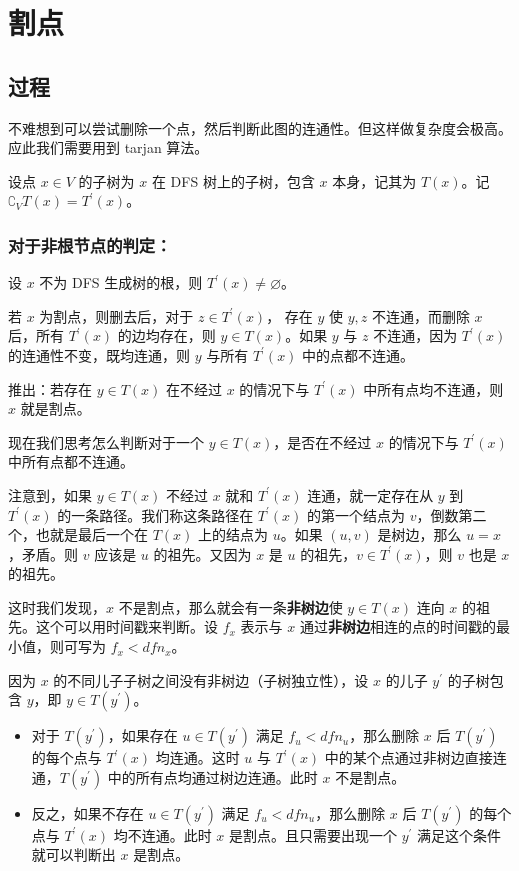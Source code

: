 \documentclass[11pt,oneside,a4paper,UTF8]{book}
\begin{document}
	
	\section{割点}
	\subsection{过程}
	不难想到可以尝试删除一个点，然后判断此图的连通性。但这样做复杂度会极高。应此我们需要用到 tarjan 算法。\par
	设点 $x\in V$ 的子树为 $x$ 在 DFS 树上的子树，包含 $x$ 本身，记其为 $T(x)$。记 $\complement_{V}T(x) = T^{\prime}(x)$。
	\subsubsection{对于非根节点的判定：}
	设 $x$ 不为 DFS 生成树的根，则 $T^{\prime}(x) \not= \varnothing$。\par
	若 $x$ 为割点，则删去后，对于 $z \in T^\prime(x)$， 存在 $y$ 使 $y,z$ 不连通，而删除 $x$ 后，所有 $T^\prime(x)$ 的边均存在，则 $y\in T(x)$。如果 $y$ 与 $z$ 不连通，因为 $T^\prime(x)$ 的连通性不变，既均连通，则 $y$ 与所有 $T^\prime(x)$ 中的点都不连通。\par
	推出：若存在 $ y \in T(x)$ 在不经过 $x$ 的情况下与 $T^\prime(x)$ 中所有点均不连通，则 $x$ 就是割点。\par
	现在我们思考怎么判断对于一个 $y \in T(x)$，是否在不经过 $x$ 的情况下与 $T^\prime(x)$ 中所有点都不连通。\par
	注意到，如果 $y\in T(x)$ 不经过 $x$ 就和 $T^\prime(x)$ 连通，就一定存在从 $y$ 到 $T^\prime(x)$ 的一条路径。我们称这条路径在 $T^\prime(x)$ 的第一个结点为 $v$，倒数第二个，也就是最后一个在 $T(x)$ 上的结点为 $u$。如果 $(u,v)$ 是树边，那么 $u=x$，矛盾。则 $v$ 应该是 $u$ 的祖先。又因为 $x$ 是 $u$ 的祖先，$v\in T^\prime(x)$，则 $v$ 也是 $x$ 的祖先。\par 
	这时我们发现，$x$ 不是割点，那么就会有一条\textbf{非树边}使 $y\in T(x)$ 连向 $x$ 的祖先。这个可以用时间戳来判断。设 $f_x$ 表示与 $x$ 通过\textbf{非树边}相连的点的时间戳的最小值，则可写为 $f_x < dfn_x$。\par
	因为 $x$ 的不同儿子子树之间没有非树边（子树独立性），设 $x$ 的儿子 $y^\prime$ 的子树包含 $y$，即 $y\in T(y^\prime)$。\par
	\begin{itemize}
		\item 对于 $T(y^\prime)$，如果存在 $u\in T(y^\prime)$ 满足 $f_u < dfn_u$，那么删除 $x$ 后 $T(y^\prime)$ 的每个点与 $T^\prime(x)$ 均连通。这时 $u$ 与 $T^\prime(x)$ 中的某个点通过非树边直接连通，$T(y^\prime)$ 中的所有点均通过树边连通。此时 $x$ 不是割点。\par
		\item 反之，如果不存在 $u\in T(y^\prime)$ 满足 $f_u < dfn_u$，那么删除 $x$ 后 $T(y^\prime)$ 的每个点与 $T^\prime(x)$ 均不连通。此时 $x$ 是割点。且只需要出现一个 $y^\prime$ 满足这个条件就可以判断出 $x$ 是割点。
	\end{itemize}\par
\end{document}
